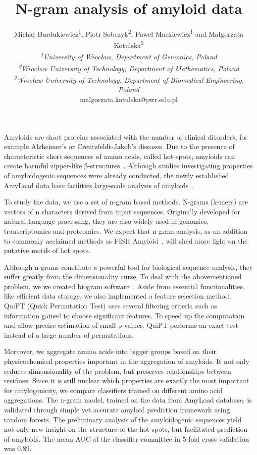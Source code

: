 \documentclass[english]{gcb15abstract}
\title{N-gram analysis of amyloid data}
\author{
Micha\l{} Burdukiewicz\textsuperscript{1}, Piotr Sobczyk\textsuperscript{2}, Pawe\l{} Mackiewicz\textsuperscript{1} and Ma\l{}gorzata Kotulska\textsuperscript{3} \\
{\normalsize\normalfont\itshape \textsuperscript{1}University of Wroc\l{}aw, Department of Genomics, Poland}\\
{\normalsize\normalfont\itshape \textsuperscript{2}Wroc\l{}aw University of Technology, Department of Mathematics, Poland}\\
{\normalsize\normalfont\itshape \textsuperscript{3}Wroc\l{}aw University of Technology, Department of Biomedical Engineering, Poland}\\
malgorzata.kotulska@pwr.edu.pl
}
\begin{document}
\maketitle 

Amyloids are short proteins associated with the number of clinical disorders, for example Alzheimer's or Creutzfeldt-Jakob’s diseases. Due to the presence of characteristic short sequences of amino acids, called hot-spots, amyloids can create harmful zipper-like β-structures~\cite{breydo_structural_2015}. Although studies investigating properties of amyloidogenic sequences were already conducted, the newly established AmyLoad data base facilities large-scale analysis of amyloids~\cite{wozniak_amyload:_2015}.

To study the data, we use a set of n-gram based methods. N-grams (k-mers) are vectors of n characters derived from input sequences. Originally developed for natural language processing, they are also widely used in genomics, transcriptomics and proteomics. We expect that n-gram analysis, as an addition to commonly acclaimed methods as FISH Amyloid~\cite{gasior_fish_2014}, will shed more light on the putative motifs of hot spots. 

Although n-grams constitute a powerful tool for biological sequence analysis, they suffer greatly from the dimensionality curse. To deal with the abovementioned problem, we we created biogram software~\cite{biogram2015}. Aside from essential  functionalities, like efficient data storage, we also implemented a feature selection method. QuiPT (Quick Permutation Test) uses several filtering criteria such as information gained to choose significant features. To speed up the computation and allow precise estimation of small p-values, QuiPT performs an exact test instead of a large number of permutations. 

Moreover, we aggregate amino acids into bigger groups based on their physicochemical properties important in the aggregation of amyloids. It not only reduces dimensionality of the problem, but preserves relationships between residues. Since it is still unclear which properties are exactly the most important for amylogenicity, we compare classifiers trained on different amino acid aggregations.
The n-gram model, trained on the data from AmyLoad database, is validated through simple yet accurate amyloid prediction framework using random forests. The preliminary analysis of the amyloidogenic sequences yield not only new insight on the structure of the hot spots, but facilitated prediction of amyloids. The mean AUC of the classifier committee in 5-fold cross‑validation was 0.89.



\end{document}
